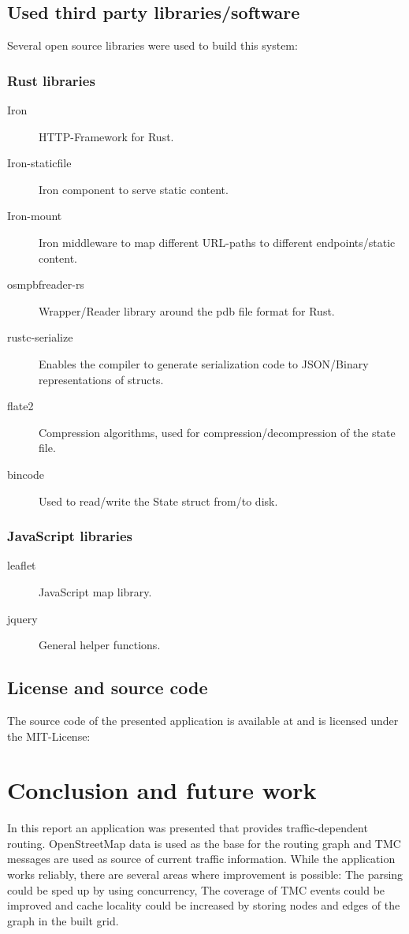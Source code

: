\documentclass[a4paper]{scrartcl}
\begin{document}
\subsection{Used third party libraries/software}
Several open source libraries were used to build this system:

\subsubsection{Rust libraries}
\begin{description}
\item[Iron]\cite{iron} HTTP-Framework for Rust.
\item[Iron-staticfile]\cite{iron_staticfile} Iron component to serve static content.
\item[Iron-mount]\cite{iron_mount} Iron middleware to map different URL-paths to different endpoints/static content.
\item[osmpbfreader-rs]\cite{osmpbfreader} Wrapper/Reader library around the pdb file format for Rust.
\item[rustc-serialize]\cite{rustc-serialize} Enables the compiler to generate serialization code to JSON/Binary representations of structs.
\item[flate2]\cite{flate2} Compression algorithms, used for compression/decompression of the state file.
\item[bincode]\cite{bincode} Used to read/write the State struct from/to disk.
\end{description}

\subsubsection{JavaScript libraries}
\begin{description}
\item[leaflet]\cite{leaflet} JavaScript map library.
\item[jquery] \cite{jquery} General helper functions.
\end{description}

\subsection{License and source code}
The source code of the presented application is available at \cite{github} and is licensed under the MIT-License:



\section{Conclusion and future work}
\label{concl}
In this report an application was presented that provides traffic-dependent routing. OpenStreetMap data is used as the base for the routing graph and TMC messages are used as source of current traffic information. While the application works reliably, there are several areas where improvement is possible: The parsing could be sped up by using concurrency, The coverage of TMC events could be improved and cache locality could be increased by storing nodes and edges of the graph in the built grid. 
\end{document}
